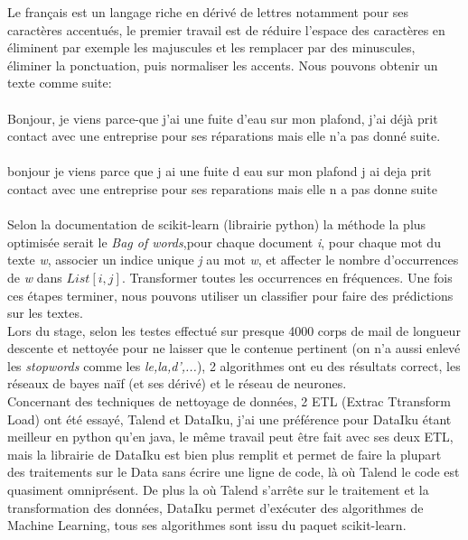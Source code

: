 Le français est un langage riche en dérivé de lettres notamment pour ses caractères accentués, le premier travail est de réduire l'espace des caractères en éliminent par exemple les majuscules et les remplacer par des minuscules, éliminer la ponctuation, puis normaliser les accents. Nous pouvons obtenir un texte comme suite:
\\
\sepline\\
Bonjour, je viens parce-que j'ai une fuite d'eau sur mon plafond, j'ai déjà prit contact avec une entreprise pour ses réparations mais elle n'a pas donné suite.\\
\sepline\\
bonjour je viens parce que j ai une fuite d eau sur mon plafond j ai deja prit contact avec une entreprise pour ses reparations mais elle n a pas donne suite\\
\sepline\\

Selon la documentation de scikit-learn (librairie python) la méthode la plus optimisée serait le \textit{Bag of words},pour chaque document \textit{i}, pour chaque mot du texte \textit{w}, associer un indice unique \textit{j} au mot \textit{w}, et affecter le nombre d'occurrences de \textit{w} dans $List[i,j]$. Transformer toutes les occurrences en fréquences. Une fois ces étapes terminer, nous pouvons utiliser un classifier pour faire des prédictions sur les textes.\\
Lors du stage, selon les testes effectué sur presque 4000 corps de mail de longueur descente et nettoyée pour ne laisser que le contenue pertinent (on n'a aussi enlevé les \textit{stopwords} comme les \textit{le,la,d',...}), 2 algorithmes ont eu des résultats correct, les réseaux  de bayes naïf (et ses dérivé) et le réseau de neurones.\\
\linebreak
Concernant des techniques de nettoyage de données, 2 ETL (Extrac Ttransform Load) ont été essayé, Talend et DataIku, j'ai une préférence pour DataIku étant meilleur en python qu'en java, le même travail peut être fait avec ses deux ETL, mais la librairie de DataIku est bien plus remplit et permet de faire la plupart des traitements sur le Data sans écrire une ligne de code, là où Talend le code est quasiment omniprésent. De plus la où Talend s'arrête sur le traitement et la transformation des données, DataIku permet d'exécuter des algorithmes de Machine Learning, tous ses algorithmes sont issu du paquet scikit-learn.
\pagebreak

